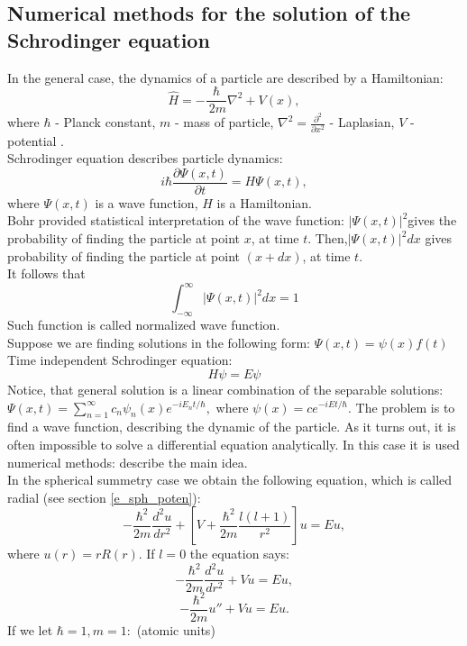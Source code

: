 \documentclass[a4paper, 12pt]{article}
\begin{document}
\subsection{Numerical methods for the solution of the Schrodinger equation} \label{sec:numerical}
In the general case, the dynamics of a particle are described by a Hamiltonian: 
\begin{equation}\label{hamiltonian}
	\hat{H} =- \dfrac{\hbar}{\ {2}{m}} \nabla^2  + V(x),
\end{equation}
where $\hbar$ - Planck constant, ${m}$ - mass of particle, $\nabla^2 = \frac{\partial^2}{\partial x^2}$ - Laplasian,  $V$ - potential .\\
Schrodinger equation describes particle dynamics:
\begin{equation}\label{schr_eq}
	i \hbar \frac{\partial \Psi(x, t)}{\partial t} = H \Psi(x,t),
\end{equation}
where $\Psi(x, t)$ is a wave function, $H$ is a Hamiltonian.\\
Bohr provided statistical interpretation of the wave function: $|\Psi(x,t)|^2 $gives the probability of finding the particle at point $x$, at time $t$. Then,$|\Psi(x,t)|^2 dx $ gives probability of finding the particle at point $(x+dx)$, at time $t.$\\
It follows that 
$$\int_{-\infty}^\infty |\Psi(x,t)|^2 dx = 1$$
Such function is called normalized wave function.\\
Suppose we are finding solutions in the following form: $\Psi(x, t) = \psi(x) f(t)$
Time independent Schrodinger equation:
\begin{equation}\label{t-indep}
	H \psi = E \psi
\end{equation}
Notice, that general solution is a linear combination of the separable solutions: $\Psi(x,t) = \sum_{n=1}^\infty c_n \psi_n (x) e^{-i E_nt/ \hbar},$ where $\psi(x) = c e^{-iEt/ \hbar}.$
The problem is to find a wave function, describing the dynamic of the particle. As it turns out, it is often impossible to solve a differential equation analytically. In this case it is used numerical methods: describe the main idea.\\
In the spherical summetry case we obtain the following equation, which is called radial (see section \ref{e_sph_poten}): 
$$-\frac{\hbar^2}{2m}\frac{d^2 u}{d r^2}+[V+\frac{\hbar^2}{2m}\frac{l(l+1)}{r^2}]u = Eu,$$
where $u(r) = r R(r).$ 
If  $l=0$ the equation says:
$$-\frac{\hbar^2}{2m}\frac{d^2 u}{d r^2}+Vu = Eu,$$
$$-\frac{\hbar^2}{2m}u''+Vu = Eu.$$
If we let $\hbar = 1, m=1:$ (atomic units)
\end{document}
